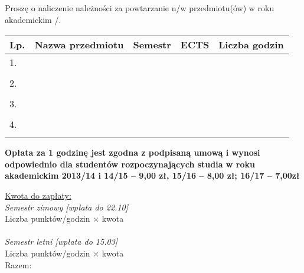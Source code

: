 \documentclass{wmiisubmission}
\begin{document}
\cracowdate
{}
\studentaddress
\addressee[-1em]{\piotrniemiec}

\vskip 1.5cm

Proszę o naliczenie należności za powtarzanie n/w przedmiotu(ów) w roku
akademickim \fillField{1cm}/\fillField{1cm}.\\

\begin{tabularx}{\textwidth}{|l|X|l|l|l|}

    \hline
    \textbf{Lp.} & \textbf{Nazwa przedmiotu} \hspace{0.9cm} & {\textbf{Semestr}} & \textbf{ECTS} & {\textbf{Liczba godzin}} \\
    \hline
    1.  &   &   &  &\\
        &   &   &  &\\
    \hline
    2.  &   &   &  &\\
        &   &   &  &\\
    \hline
    3.  &   &   &  &\\
        &   &   &  &\\
    \hline
    4.  &   &   &  &\\
        &   &   &  &\\
    \hline

\end{tabularx}

\vskip 0.3cm

\begin{minipage}{\textwidth}
    \footnotesize
    \bf
    Opłata za 1 godzinę jest zgodna z podpisaną umową i wynosi odpowiednio dla studentów rozpoczynających studia w roku akademickim 2013/14 i 14/15 – 9,00 zł, 15/16 – 8,00 zł; 16/17 – 7,00zł
\end{minipage}

\vfill

\underline{Kwota do zapłaty:}\\
\textit{Semestr zimowy [wpłata do 22.10]}\\
Liczba punktów/godzin \dotfill $\times$ kwota \dotfill \\\\
\textit{Semestr letni [wpłata do 15.03]}\\
Liczba punktów/godzin \dotfill $\times$ kwota \dotfill \\

\hspace{\fill} Razem: \fillField{6cm} \hspace{2.0cm}

\vskip 1.6cm
\studentsignature
\vfill

\end{document}
